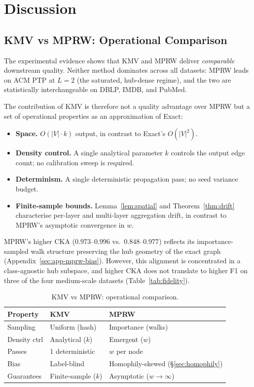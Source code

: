 \documentclass[sigconf]{acmart}
\begin{document}
\section{Discussion}
\label{sec:discussion}

\subsection{KMV vs MPRW: Operational Comparison}
\label{sec:discussion-comparison}

The experimental evidence shows that KMV and MPRW deliver \emph{comparable} downstream quality.
Neither method dominates across all datasets: MPRW leads on ACM PTP at $L{=}2$ (the saturated, hub-dense regime), and the two are statistically interchangeable on DBLP, IMDB, and PubMed.

The contribution of KMV is therefore not a quality advantage over MPRW but a set of operational properties as an approximation of Exact:

\begin{itemize}
\item \textbf{Space.} $O(|V| \cdot k)$ output, in contrast to Exact's $O(|V|^2)$.
\item \textbf{Density control.} A single analytical parameter $k$ controls the output edge count; no calibration sweep is required.
\item \textbf{Determinism.} A single deterministic propagation pass; no seed variance budget.
\item \textbf{Finite-sample bounds.} Lemma~\ref{lem:spatial} and Theorem~\ref{thm:drift} characterise per-layer and multi-layer aggregation drift, in contrast to MPRW's asymptotic convergence in $w$.
\end{itemize}

MPRW's higher CKA ($0.973$--$0.996$ vs.\ $0.848$--$0.977$) reflects its importance-sampled walk structure preserving the hub geometry of the exact graph (Appendix~\ref{sec:app-mprw-bias}). However, this alignment is concentrated in a class-agnostic hub subspace, and higher CKA does not translate to higher F1 on three of the four medium-scale datasets (Table~\ref{tab:fidelity}).

\begin{table}[t]
\caption{KMV vs MPRW: operational comparison.}
\label{tab:comparison}
\centering\small
\begin{tabular}{lll}
\toprule
Property & KMV & MPRW \\
\midrule
Sampling      & Uniform (hash)       & Importance (walks) \\
Density ctrl  & Analytical ($k$)     & Emergent ($w$) \\
Passes        & 1 deterministic      & $w$ per node \\
Bias          & Label-blind          & Homophily-skewed (\S\ref{sec:homophily}) \\
Guarantees    & Finite-sample ($k$)  & Asymptotic ($w{\to}\infty$) \\
\bottomrule
\end{tabular}
\end{table}
\end{document}
